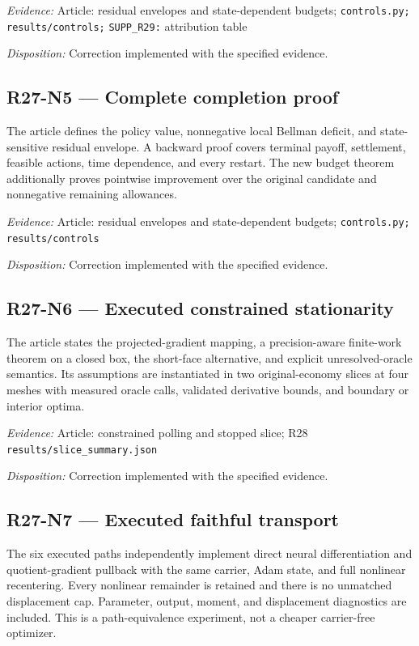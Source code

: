 \emph{Evidence:} Article: residual envelopes and state-dependent budgets; \nolinkurl{controls.py;} \nolinkurl{results/controls;} \nolinkurl{SUPP_R29:} attribution table

\emph{Disposition:} Correction implemented with the specified evidence.
\subsection{R27-N5 --- Complete completion proof}
The article defines the policy value, nonnegative local Bellman deficit, and state-sensitive residual envelope. A backward proof covers terminal payoff, settlement, feasible actions, time dependence, and every restart. The new budget theorem additionally proves pointwise improvement over the original candidate and nonnegative remaining allowances.

\emph{Evidence:} Article: residual envelopes and state-dependent budgets; \nolinkurl{controls.py;} \nolinkurl{results/controls}

\emph{Disposition:} Correction implemented with the specified evidence.
\subsection{R27-N6 --- Executed constrained stationarity}
The article states the projected-gradient mapping, a precision-aware finite-work theorem on a closed box, the short-face alternative, and explicit unresolved-oracle semantics. Its assumptions are instantiated in two original-economy slices at four meshes with measured oracle calls, validated derivative bounds, and boundary or interior optima.

\emph{Evidence:} Article: constrained polling and stopped slice; R28 \nolinkurl{results/slice_summary.json}

\emph{Disposition:} Correction implemented with the specified evidence.
\subsection{R27-N7 --- Executed faithful transport}
The six executed paths independently implement direct neural differentiation and quotient-gradient pullback with the same carrier, Adam state, and full nonlinear recentering. Every nonlinear remainder is retained and there is no unmatched displacement cap. Parameter, output, moment, and displacement diagnostics are included. This is a path-equivalence experiment, not a cheaper carrier-free optimizer.

